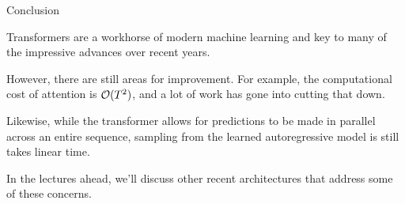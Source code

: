 \documentclass[aspectratio=169]{beamer}
\begin{document}
\begin{frame}[t,allowframebreaks]{Conclusion}\label{conclusion}

Transformers are a workhorse of modern machine learning and key to many
of the impressive advances over recent years. 

However, there are still areas for improvement. For example, the computational cost of attention
is \(\mathcal{O}(T^2)\), and a lot of work has gone into cutting that down.

Likewise, while the transformer allows for predictions to be made in
parallel across an entire sequence, sampling from the learned
autoregressive model is still takes linear time. 

In the lectures ahead, we'll discuss other recent architectures that 
address some of these concerns.
\end{frame}

    
\end{document}
